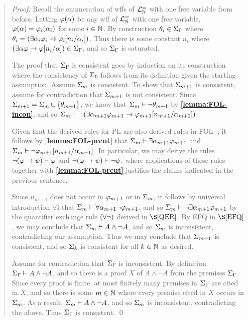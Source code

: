 \begin{quote} 
  \textit{Proof:} 
  Recall the enumeration of wffs of $\mathcal{L}^{=}_{\mathbb{N}}$ with one free variable from before. 
  Letting $\varphi(\alpha)$ be any wff of $\mathcal{L}^{=}_{\mathbb{N}}$ with one free variable, $\varphi(\alpha)=\varphi_i(\alpha_i)$ for some $i\in\mathbb{N}$.
  By construction $\theta_i\in\Sigma_{\Gamma}$ where $\theta_i=(\exists \alpha_i\varphi_i \rightarrow \varphi_i[n_i/\alpha_i])$.
  Thus there is some constant $n_i$ where $(\exists \alpha\varphi \rightarrow \varphi[n_i/\alpha])\in\Sigma_{\Gamma}$, and so $\Sigma_{\Gamma}$ is saturated. 

  The proof that $\Sigma_{\Gamma}$ is consistent goes by induction on its construction where the consistency of $\Sigma_0$ follows from its definition given the starting assumption.
  Assume $\Sigma_m$ is consistent.
  To show that $\Sigma_{m+1}$ is consistent, assume for contradiction that $\Sigma_{m+1}$ is not consistent.
  Since $\Sigma_{m+1}=\Sigma_m\cup\lbrace\theta_{m+1}\rbrace$, we know that $\Sigma_m\vdash \neg\theta_{m+1}$ by \textbf{\ref{lemma:FOL-incon}}, and so $\Sigma_m\vdash\neg(\exists \alpha_{m+1}\varphi_{m+1}\rightarrow \varphi_{m+1}[n_{m+1}/\alpha_{m+1}])$.

  Given that the derived rules for PL are also derived rules in FOL$^=$, it follows by \textbf{\ref{lemma:FOL-prcut}} that $\Sigma_m\vdash \exists \alpha_{m+1}\varphi_{m+1}$ and $\Sigma_m\vdash\neg\varphi_{m+1}[n_{m+1}/\alpha_{m+1}]$.
  In particular, we may derive the rules $\neg(\varphi \rightarrow \psi) \vdash \varphi$ and $\neg(\varphi \rightarrow \psi) \vdash \neg\psi$, where applications of these rules together with \textbf{\ref{lemma:FOL-prcut}} justifies the claims indicated in the previous sentence.

  Since $n_{m+1}$ does not occur in $\varphi_{m+1}$ or in $\Sigma_m$, it follows by universal introduction $\forall$I that $\Sigma_m\vdash \forall \alpha_{m+1}\neg\varphi_{m+1}$, and so $\Sigma_m\vdash \neg\exists \alpha_{m+1}\varphi_{m+1}$ by the quantifier exchange rule $(\forall\neg)$ derived in $\S\ref{QER}$.
  By EFQ in $\S\ref{EFQ}$, we may conclude that $\Sigma_m\vdash A\wedge\neg A$, and so $\Sigma_m$ is inconsistent, contradicting our assumption. 
  Thus we may conclude that $\Sigma_{m+1}$ is consistent, and so $\Sigma_k$ is consistent for all $k\in\mathbb{N}$ as desired.

  Assume for contradiction that $\Sigma_{\Gamma}$ is inconsistent. 
  By definition $\Sigma_{\Gamma}\vdash A\wedge\neg A$, and so there is a proof $X$ of $A\wedge\neg A$ from the premises $\Sigma_{\Gamma}$.
  Since every proof is finite, at most finitely many premises in $\Sigma_{\Gamma}$ are cited in $X$, and so there is some $m\in\mathbb{N}$ where every premise cited in $X$ occurs in $\Sigma_m$.
  As a result, $\Sigma_m\vdash A\wedge\neg A$, and so $\Sigma_m$ is inconsistent, contradicting the above. 
  Thus $\Sigma_{\Gamma}$ is consistent. 
  \qed
\end{quote}

